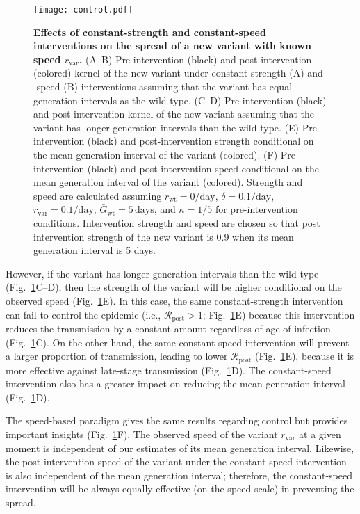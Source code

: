 \documentclass[12pt]{article}
\newcommand{\fref}[1]{Fig.~\ref{fig:#1}}
\newcommand{\vvvar}{\mathrm{var}}
\newcommand{\wwwt}{\mathrm{wt}}
\newcommand{\rx}[1]{\ensuremath{{r}_{#1}}\xspace}
\newcommand{\rw}{\rx{\wwwt}}
\newcommand{\rv}{\rx{\vvvar}}
\newcommand{\Rx}[1]{\ensuremath{{\mathcal R}_{#1}}\xspace}
\newcommand{\Ry}[1]{\Rx{\mathrm{#1}}}
\newcommand{\pday}{\ensuremath{/\textrm{day}}}
\newcommand{\Gx}[1]{\ensuremath{{\bar G}_{#1}}\xspace}
\newcommand{\Gy}[1]{\Gx{\mathrm{#1}}}
\begin{document}
\begin{figure}[!th]
\texttt{[image: control.pdf]}
\caption{
\textbf{Effects of constant-strength and constant-speed interventions on the spread of a new variant with known speed \rv.}
(A--B) Pre-intervention (black) and post-intervention (colored) kernel of the new variant under constant-strength (A) and -speed (B) interventions assuming that the variant has equal generation intervals as the wild type.
(C--D) Pre-intervention (black) and post-intervention kernel of the new variant assuming that the variant has longer generation intervals than the wild type.
(E) Pre-intervention (black) and post-intervention strength conditional on the mean generation interval of the variant (colored).
(F) Pre-intervention (black) and post-intervention speed conditional on the mean generation interval of the variant (colored).
Strength and speed are calculated assuming $\rw=0\pday$, $\delta=0.1\pday$, $\rv=0.1\pday$, $\Gy{wt}=5\,\textrm{days}$, and $\kappa=1/5$ for pre-intervention conditions.
Intervention strength and speed are chosen so that post intervention strength of the new variant is 0.9 when its mean generation interval is 5 days.
}
\label{fig:strengthspeed}
\end{figure}

However, if the variant has longer generation intervals than the wild type (\fref{strengthspeed}C--D),  then the strength of the variant will be higher conditional on the observed speed (\fref{strengthspeed}E).
In this case, the same constant-strength intervention can fail to control the epidemic (i.e., $\Ry{post} > 1$; \fref{strengthspeed}E) because this intervention reduces the transmission by a constant amount regardless of age of infection (\fref{strengthspeed}C).
On the other hand, the same constant-speed intervention will prevent a larger proportion of transmission, leading to lower $\Ry{post}$ (\fref{strengthspeed}E), because it is more effective against late-stage transmission (\fref{strengthspeed}D).
The constant-speed intervention also has a greater impact on reducing the mean generation interval (\fref{strengthspeed}D).

The speed-based paradigm gives the same results regarding control but provides important insights (\fref{strengthspeed}F).
The observed speed of the variant $\rv$ at a given moment is independent of our estimates of its mean generation interval.
Likewise, the post-intervention speed of the variant under the constant-speed intervention is also independent of the mean generation interval;
therefore, the constant-speed intervention will be always equally effective (on the speed scale) in preventing the spread.
\end{document}

